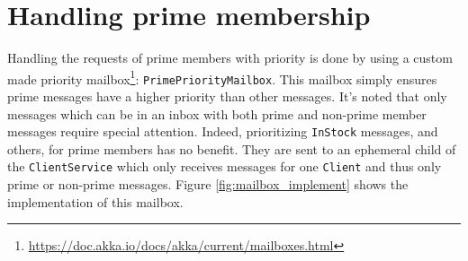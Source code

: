 
\section{Handling prime membership}
\label{sec:prime}

Handling the requests of prime members with priority is done by using a custom made priority mailbox\footnote{\url{https://doc.akka.io/docs/akka/current/mailboxes.html}}: \texttt{PrimePriorityMailbox}.
This mailbox simply ensures prime messages have a higher priority than other messages.
It's noted that only messages which can be in an inbox with both prime and non-prime member messages require special attention.
Indeed, prioritizing \texttt{InStock} messages, and others, for prime members has no benefit. They are sent to an ephemeral child of the \texttt{ClientService} which only receives messages for one \texttt{Client} and thus only prime or non-prime messages.
Figure \ref{fig:mailbox_implement} shows the implementation of this mailbox.